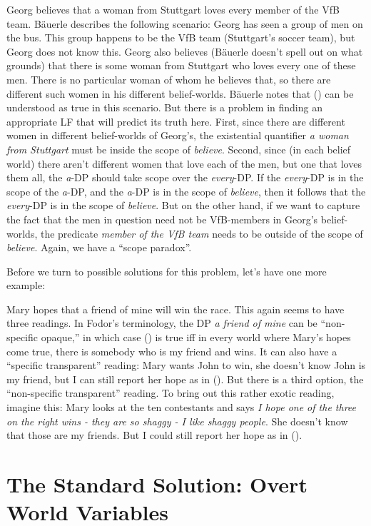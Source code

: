 \ex Georg believes that a woman from Stuttgart loves every member of the VfB team. \xe
%
Bäuerle describes the following scenario: Georg has seen a group of men on the bus. This group happens to be the VfB team (Stuttgart's soccer team), but Georg does not know this. Georg also believes (Bäuerle doesn't spell out on what grounds) that there is some woman from Stuttgart who loves every one of these men. There is no particular woman of whom he believes that, so there are different such women in his different belief-worlds. Bäuerle notes that (\lastx) can be understood as true in this scenario. But there is a problem in finding an appropriate LF that will predict its truth here. First, since there are different women in different belief-worlds of Georg's, the existential quantifier \emph{a woman from Stuttgart} must be inside the scope of \emph{believe}. Second, since (in each belief world) there aren't different women that love each of the men, but one that loves them all, the \emph{a}-DP should take scope over the \emph{every}-DP. If the \emph{every}-DP is in the scope of the \emph{a}-DP, and the \emph{a}-DP is in the scope of \emph{believe}, then it follows that the \emph{every}-DP is in the scope of \emph{believe}. But on the other hand, if we want to capture the fact that the men in question need not be VfB-members in Georg's belief-worlds, the predicate \emph{member of the VfB team} needs to be outside of the scope of \emph{believe}. Again, we have a ``scope paradox''.

Before we turn to possible solutions for this problem, let's have one
more example:

\ex Mary hopes that a friend of mine will win the race. \xe
%
This again seems to have three readings. In Fodor's terminology, the DP \emph{a friend of mine} can be ``non-specific opaque,'' in which case (\lastx) is true iff in every world where Mary's hopes come true, there is somebody who is my friend and wins. It can also have a ``specific transparent'' reading: Mary wants John to win, she doesn't know John is my friend, but I can still report her hope as in (\lastx). But there is a third option, the ``non-specific transparent'' reading. To bring out this rather exotic reading, imagine this: Mary looks at the ten contestants and says \emph{I hope one of the three on the right wins - they are so shaggy - I like shaggy people}. She doesn't know that those are my friends. But I could still report her hope as in (\lastx).

\section{The Standard Solution: Overt World Variables}

